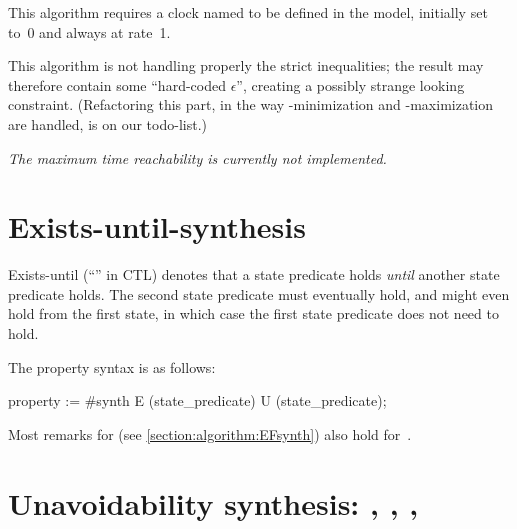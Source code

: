 This algorithm requires a clock named  to be defined in the model, initially set to~0 and always at rate~1.

\begin{becareful}
	This algorithm is not handling properly the strict inequalities; the result may therefore contain some ``hard-coded $\epsilon$'', creating a possibly strange looking constraint.
	(Refactoring this part, \eg{} in the way -minimization and -maximization are handled, is on our todo-list.)
\end{becareful}

\emph{The maximum time reachability is currently not implemented.}


\section{Exists-until-synthesis}\label{section:algorithm:EU}

Exists-until (``'' in CTL) denotes that a state predicate holds \emph{until} another state predicate holds.
The second state predicate must eventually hold, and might even hold from the first state, in which case the first state predicate does not need to hold.

The property syntax is as follows:

\begin{IMITATORproperty}
property := #synth E (state_predicate) U (state_predicate);
\end{IMITATORproperty}

Most remarks for  (see \cref{section:algorithm:EFsynth}) also hold for~.


\section{Unavoidability synthesis: , , , }\label{section:algorithm:AF}

